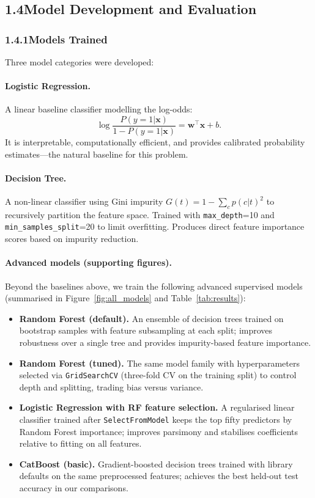 \documentclass[12pt,a4paper]{article}
\newcommand{\GridSearchCVname}{\texttt{Grid\allowbreak Search\allowbreak CV}}
\begin{document}
\subsection{1.4\quad Model Development and Evaluation}

\subsubsection{1.4.1\quad Models Trained}

Three model categories were developed:

\paragraph{Logistic Regression.} A linear baseline classifier modelling the log-odds:
\[
\log\frac{P(y=1|\mathbf{x})}{1-P(y=1|\mathbf{x})}
=
\mathbf{w}^\top \mathbf{x} + b.
\]
It is interpretable, computationally efficient, and provides calibrated probability estimates---the natural baseline for this problem.

\paragraph{Decision Tree.} A non-linear classifier using Gini impurity $G(t) = 1 - \sum_c p(c|t)^2$ to recursively partition the feature space. Trained with \texttt{max\_depth}=10 and \texttt{min\_samples\_split}=20 to limit overfitting. Produces direct feature importance scores based on impurity reduction.

\paragraph{Advanced models (supporting figures).}
Beyond the baselines above, we train the following advanced supervised models (summarised in Figure~\ref{fig:all_models} and Table~\ref{tab:results}):
\begin{itemize}[leftmargin=1.5em]
    \item \textbf{Random Forest (default).} An ensemble of decision trees trained on bootstrap samples with feature subsampling at each split; improves robustness over a single tree and provides impurity-based feature importance.
    \item \textbf{Random Forest (tuned).} The same model family with hyperparameters selected via \GridSearchCVname{} (three-fold CV on the training split) to control depth and splitting, trading bias versus variance.
    \item \textbf{Logistic Regression with RF feature selection.} A regularised linear classifier trained after \texttt{SelectFromModel} keeps the top fifty predictors by Random Forest importance; improves parsimony and stabilises coefficients relative to fitting on all features.
    \item \textbf{CatBoost (basic).} Gradient-boosted decision trees trained with library defaults on the same preprocessed features; achieves the best held-out test accuracy in our comparisons.
\end{itemize}
\end{document}
